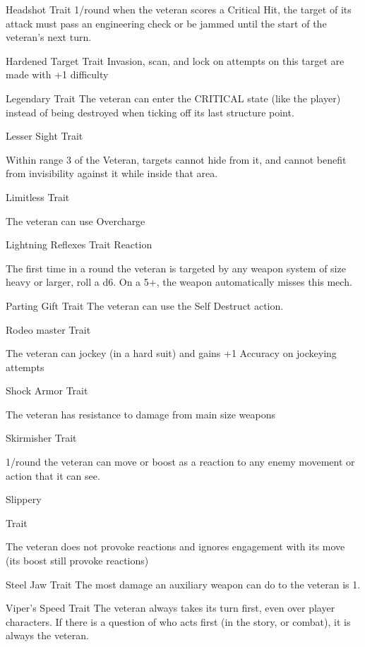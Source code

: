 Headshot
Trait
1/round when the veteran scores a Critical Hit, the target of its attack must pass an engineering
check or be jammed until the start of the veteran's next turn.


Hardened Target
Trait
Invasion, scan, and lock on attempts on this target are made with +1 difficulty


Legendary
Trait
The veteran can enter the CRITICAL state (like the player) instead of being destroyed when
ticking off its last structure point.


Lesser Sight
Trait

Within range 3 of the Veteran, targets cannot hide from it, and cannot benefit from invisibility
against it while inside that area.


Limitless
Trait

The veteran can use Overcharge


Lightning Reflexes
Trait
Reaction

The first time in a round the veteran is targeted by any weapon system of size heavy or larger, roll
a d6. On a 5+, the weapon automatically misses this mech.


Parting Gift
Trait
The veteran can use the Self Destruct action.


Rodeo master
Trait




The veteran can jockey (in a hard suit) and gains +1 Accuracy on jockeying attempts


Shock Armor
Trait

The veteran has resistance to damage from main size weapons


Skirmisher
Trait

1/round the veteran can move or boost as a reaction to any enemy movement or action that it
can see.


Slippery

Trait

The veteran does not provoke reactions and ignores engagement with its move (its boost still
provoke reactions)


Steel Jaw
Trait
The most damage an auxiliary weapon can do to the veteran is 1.


Viper's Speed
Trait
The veteran always takes its turn first, even over player characters. If there is a question of who
acts first (in the story, or combat), it is always the veteran.
